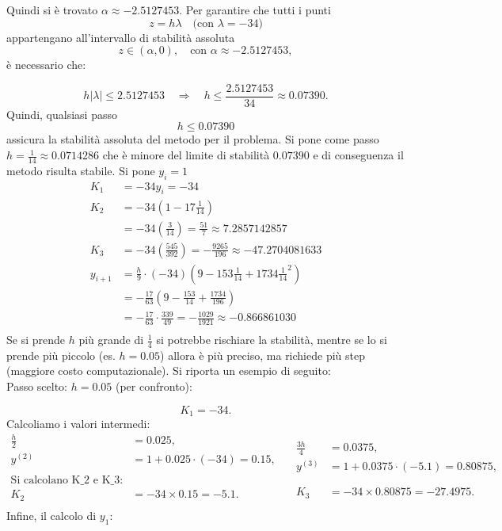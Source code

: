 \documentclass[11pt]{article}
\begin{document}
Quindi si è trovato $\alpha \approx -2.5127453$. Per garantire che tutti i punti 
\[
z = h\lambda \quad \text{(con } \lambda = -34 \text{)}
\]
appartengano all'intervallo di stabilità assoluta
\[
z \in (\alpha, 0), \quad \text{con } \alpha \approx -2.5127453,
\]
è necessario che:

\[
h|\lambda| \leq 2.5127453 \quad \Longrightarrow \quad h \leq \frac{2.5127453}{34} \approx 0.07390.
\]
Quindi, qualsiasi passo
\[
h \leq 0.07390
\]
assicura la stabilità assoluta del metodo per il problema.
Si pone come passo $h=\frac{1}{14}\approx0.0714286$ che è minore del limite di stabilità $0.07390$ e di conseguenza il metodo risulta stabile. Si pone $y_i=1$
\begin{align}
	K_1&=-34y_i=-34\\
	K_2&=-34(1-17\frac{1}{14})\\
	&=-34\left(\frac{3}{14} \right)=\frac{51}{7}\approx7.2857142857\\
	K_3&=-34\left(\frac{545}{392}\right)=-\frac{9265}{196}\approx-47.2704081633\\
	y_{i+1}&=\frac{h}{9}\cdot(-34)(9-153\frac{1}{14}+1734\frac{1}{14}^2)\\
	&=-\frac{17}{63}(9-\frac{153}{14}+\frac{1734}{196})\\
	&=-\frac{17}{63}\cdot\frac{339}{49}=-\frac{1029}{1921}\approx-0.866861030\\
\end{align}
Se si prende $h$ più grande  di $\frac{1}{4}$ si potrebbe rischiare la stabilità, mentre se lo si prende più piccolo (es. $h=0.05$) allora è più preciso, ma richiede più step (maggiore costo computazionale). Si riporta un esempio di seguito:\\
Passo scelto: \( h = 0.05 \) (per confronto):

\[
K_1 = -34.
\]
Calcoliamo i valori intermedi:
\[
\begin{aligned}
\frac{h}{2} &= 0.025, \\
y^{(2)} &= 1 + 0.025 \cdot (-34) = 0.15, \\\\
\text{Si calcolano K\_2 e K\_3:}\\
K_2 &= -34 \times 0.15 = -5.1.\\
\end{aligned}
\quad
\begin{aligned}
\frac{3h}{4} &= 0.0375, \\
y^{(3)} &= 1 + 0.0375 \cdot (-5.1) = 0.80875, \\\\\\
K_3 &= -34 \times 0.80875 = -27.4975.
\end{aligned}
\]
Infine, il calcolo di \( y_1 \):
\end{document}
